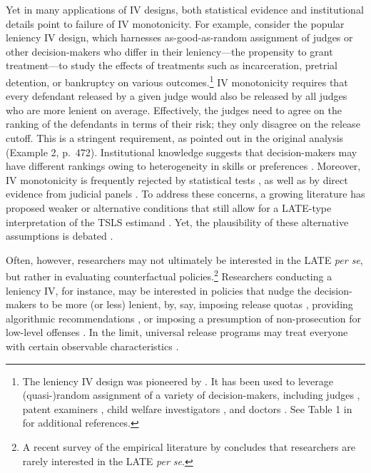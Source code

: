 \documentclass[12pt]{article}%
\theoremstyle{definition}
\newcommand\1{\operatorname{I}\indicatorfence}
\begin{document}
Yet in many applications of \ac{IV} designs, both statistical evidence and
institutional details point to failure of IV monotonicity. For example, consider
the popular leniency \ac{IV} design, which harnesses as-good-as-random
assignment of judges or other decision-makers who differ in their leniency---the
propensity to grant treatment---to study the effects of treatments such as
incarceration, pretrial detention, or bankruptcy on various
outcomes.\footnote{The leniency \ac{IV} design was pioneered by
  \textcite{kling06}. It has been used to leverage (quasi-)random assignment of a variety of decision-makers, including judges
  \parencite[e.g.][]{AiDo15,DoSo15,dgy18}, patent examiners
  \parencite[e.g.][]{SaWi19}, child welfare investigators
  \parencite[e.g.][]{doyle2007child}, and doctors \parencite[e.g.][]{cgy22}. See Table 1 in \textcite{fll23} for additional references.} IV monotonicity requires that every defendant
released by a given judge would also be released by all judges who are more
lenient on average. Effectively, the judges need to agree on the ranking of the
defendants in terms of their risk; they only disagree on the release cutoff.
This is a stringent requirement, as pointed out in the original
\textcite{ImAn94} analysis (Example 2, p.~472). Institutional knowledge suggests
that decision-makers may have different rankings owing to heterogeneity in
skills \parencite{cgy22} or preferences \parencite{mueller-smith15}. Moreover,
IV monotonicity is frequently rejected by statistical tests
\parencite[e.g.][]{fll23}, as well as by direct evidence from judicial panels
\parencite{sigstad_monotonicity_2023}. To address these concerns, a growing
literature has proposed weaker or alternative conditions that still allow for a
\ac{LATE}-type interpretation of the \ac{TSLS} estimand
\parencite[e.g.][]{dechaisemartin17,strlb17,fll23, mtw21}. Yet, the plausibility of
these alternative assumptions is debated \parencite{MoTo24}.

Often, however, researchers may not ultimately be interested in the LATE \emph{per se}, but rather in evaluating counterfactual policies.\footnote{A recent survey of the empirical
  literature by \textcite{lss25} concludes that researchers are rarely
  interested in the LATE \emph{per se}.}
Researchers conducting a leniency IV, for instance, may be interested in
policies that nudge the decision-makers to be more (or less) lenient, by, say,
imposing release quotas \parencite{adh22}, providing algorithmic recommendations
\parencite{ady23}, or imposing a presumption of non-prosecution for low-level
offenses \parencite{adh23}. In the limit, universal release programs may treat
everyone with certain observable characteristics \parencite{albright22}.
\end{document}
